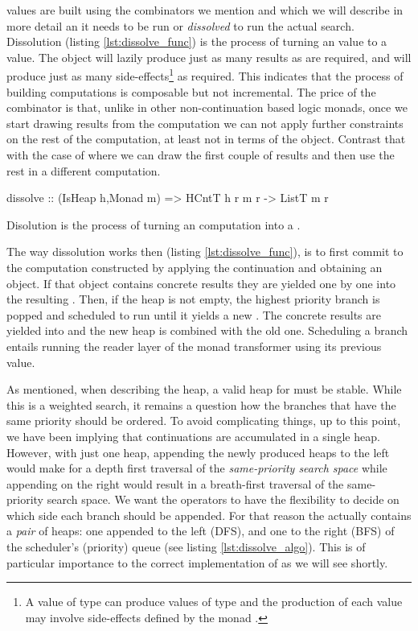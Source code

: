  values are built using the combinators we mention and which we will
describe in more detail an it needs to be run or \emph{dissolved} to run the actual
search. Dissolution (listing \ref{lst:dissolve_func}) is the process
of turning an  value to a  value. The
 object will lazily produce just as many results as are
required, and will produce just as many side-effects\footnote{A value of type  can produce values of type  and the production of each value may involve side-effects defined by the monad .} as required.
This indicates that the process of building computations is
composable but not incremental. The price of the \hask{<//>}
combinator is that, unlike in other non-continuation
based logic  monads, once we start drawing results from the computation we can
not apply further constraints on the rest of the computation, at least not
in terms of the  object.  Contrast that with the case of
 where we can draw the first couple of results and then
use the rest in a different computation.

\begin{code}
\begin{haskellcode}
dissolve :: (IsHeap h,Monad m) => HCntT h r m r -> ListT m r
\end{haskellcode}
  \caption{\label{lst:dissolve_func}Disolution is the process of
    turning an  computation into a .}
\end{code}

The way dissolution works then (listing \ref{lst:dissolve_func}), is to first
commit to the computation constructed by applying the continuation and
obtaining an  object. If that object contains concrete results they are
yielded one by one into the resulting .
Then, if the heap is not empty, the highest priority branch is popped and scheduled to run until it yields
a new . The concrete results are yielded into  and the
new heap is combined with the old one. Scheduling a branch entails
running the reader layer of the monad transformer using its previous
value.

As mentioned, when describing the heap, a valid heap for 
must be stable. While this is a weighted search, it remains a question
how the branches that have the same priority should be ordered.  To
avoid complicating things, up to this point, we have been implying that
continuations are accumulated in a single heap. However, with just one
heap, appending the newly produced heaps to the left would make for a
depth first traversal of the \emph{same-priority search space} while
appending on the right would result in a breath-first traversal of the same-priority search space. We
want the operators to have the flexibility to decide on which side
each branch should be appended. For that reason the 
actually contains a \emph{pair} of heaps: one appended to the left (DFS), and one
to the right (BFS) of the scheduler's (priority) queue (see listing \ref{lst:dissolve_algo}).
This is of particular importance to the correct
implementation of \hask{<//>} as we will see shortly.

